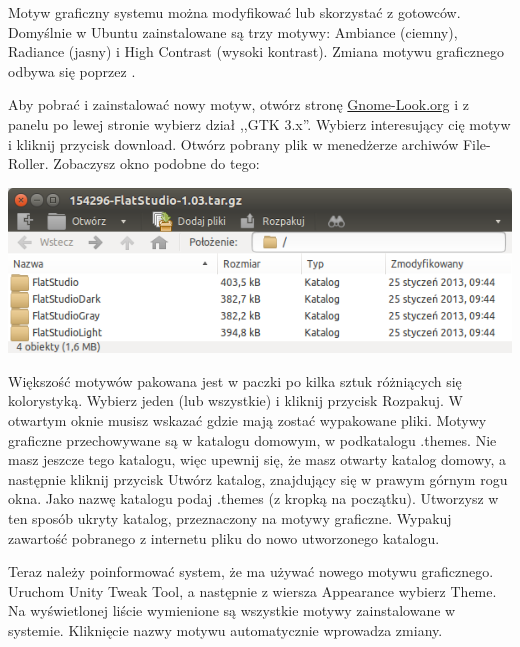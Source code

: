 Motyw graficzny systemu można modyfikować lub skorzystać z gotowców. Domyślnie w Ubuntu zainstalowane są trzy motywy: Ambiance (ciemny), Radiance (jasny) i High Contrast (wysoki kontrast). Zmiana motywu graficznego odbywa się poprzez .

Aby pobrać i zainstalować nowy motyw, otwórz stronę \href{http://gnome-look.org/}{Gnome-Look.org} i z panelu po lewej stronie wybierz dział ,,GTK 3.x''. Wybierz interesujący cię motyw i kliknij przycisk \textcolor{ubuntu_orange}{download}. Otwórz pobrany plik w menedżerze archiwów File-Roller. Zobaczysz okno podobne do tego:

\begin{center}
\includegraphics[width=\linewidth]{images/programy_fileRoller.png}
\end{center}

Większość motywów pakowana jest w paczki po kilka sztuk różniących się kolorystyką. Wybierz jeden (lub wszystkie) i kliknij przycisk \textcolor{ubuntu_orange}{Rozpakuj}. W otwartym oknie musisz wskazać gdzie mają zostać wypakowane pliki. Motywy graficzne przechowywane są w katalogu domowym, w podkatalogu .themes. Nie masz jeszcze tego katalogu, więc upewnij się, że masz otwarty katalog domowy, a następnie kliknij przycisk \textcolor{ubuntu_orange}{Utwórz katalog}, znajdujący się w prawym górnym rogu okna. Jako nazwę katalogu podaj .themes (z kropką na początku). Utworzysz w ten sposób ukryty katalog, przeznaczony na motywy graficzne. Wypakuj zawartość pobranego z internetu pliku do nowo utworzonego katalogu.

Teraz należy poinformować system, że ma używać nowego motywu graficznego. Uruchom \textcolor{ubuntu_orange}{Unity Tweak Tool}, a następnie z wiersza \textcolor{ubuntu_orange}{Appearance} wybierz \textcolor{ubuntu_orange}{Theme}. Na wyświetlonej liście wymienione są wszystkie motywy zainstalowane w systemie. Kliknięcie nazwy motywu automatycznie wprowadza zmiany.

